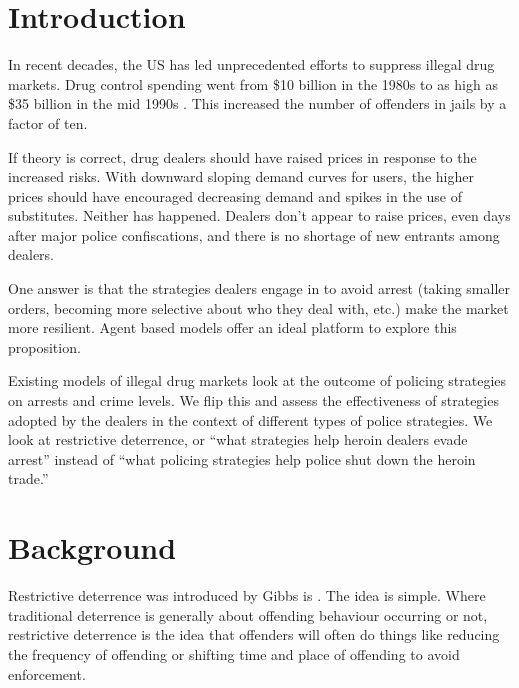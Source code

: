 \documentclass[runningheads,a4paper]{llncs}
\begin{document}
\section{Introduction}

In recent decades, the US has led unprecedented efforts to suppress illegal drug markets. Drug control spending went from \$10 billion in the 1980s to as high as \$35 billion in the mid 1990s \cite{bouchard}. This increased the number of offenders in jails by a factor of ten. 



If theory is correct, drug dealers should have raised prices in response to the increased risks. With downward sloping demand curves for users, the higher prices should have encouraged decreasing demand and spikes in the use of substitutes. Neither  has happened. Dealers don't appear to raise prices, even days after major police confiscations, and there is no shortage of new entrants among dealers.


One answer is that the strategies dealers engage in to avoid arrest (taking smaller orders, becoming more selective about who they deal with, etc.) make the market more resilient. Agent based models offer an ideal platform to explore this proposition.

Existing models of illegal drug markets look at the outcome of policing strategies on arrests and crime levels. We flip this and assess the effectiveness of strategies adopted by the dealers in the context of different types of police strategies.
We look at restrictive deterrence, or “what strategies help heroin dealers evade arrest” instead of “what policing strategies help police shut down the heroin trade.”


\section{Background}

Restrictive deterrence was introduced by Gibbs is \cite{Gibbs 1975 paper}. The idea is simple. Where traditional deterrence is generally about offending behaviour occurring or not, restrictive deterrence is the idea that offenders will often do things like reducing the frequency of offending or shifting time and place of offending to avoid enforcement. 
\end{document}
